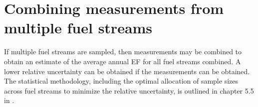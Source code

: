 \clearpage
\section{Combining measurements from multiple fuel streams}\label{Combining}

If multiple fuel streams are sampled, then measurements may be combined to obtain an estimate of the average annual EF for all fuel streams combined. A lower relative uncertainty can be obtained if the measurements can be obtained. The statistical methodology, including the optimal allocation of sample sizes across fuel streams to minimize the relative uncertainty, is outlined in chapter 5.5 in \citet{Cochran77}.